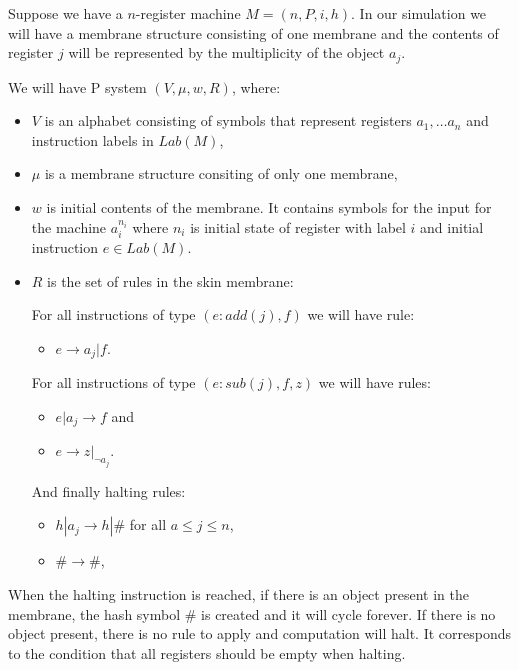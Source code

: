 \documentclass[a4paper,10pt]{article}
\begin{document}
\begin{dokaz}
\label{proof:reg_by_inh}
  Suppose we have a $n$-register machine $M = (n,P,i,h)$. In our simulation we will have a membrane structure consisting of one membrane and the contents of register $j$ will be represented by the multiplicity of the object $a_j$.

  We will have P system $(V, \mu, w, R)$, where:
  \begin{itemize}
    \item $V$ is an alphabet consisting of symbols that represent registers $a_1,\dots a_n$ and instruction labels in $Lab(M)$,
    \item $\mu$ is a membrane structure consiting of only one membrane,
    \item $w$ is initial contents of the membrane. It contains symbols for the input for the machine $a_i^{n_i}$ where $n_i$ is initial state of register with label $i$ and initial instruction $e \in Lab(M)$.
    \item $R$ is the set of rules in the skin membrane:
    
    For all instructions of type $(e : add(j), f)$ we will have rule:
    \begin{itemize}
      \item $e \rightarrow a_j|f$.
    \end{itemize}
    
    For all instructions of type $(e : sub(j), f, z)$ we will have rules:
    \begin{itemize}
      \item $e|a_j \rightarrow f$ and
      \item $e \rightarrow z|_{\neg a_j}$.
    \end{itemize}

    And finally halting rules:
    \begin{itemize}
      \item $h|a_j \rightarrow h|\#$ for all $a\leq j\leq n$,
      \item $\# \rightarrow \#$,
    \end{itemize}
  \end{itemize}

  When the halting instruction is reached, if there is an object present in the membrane, the hash symbol $\#$ is created and it will cycle forever. If there is no object present, there is no rule to apply and computation will halt. It corresponds to the condition that all registers should be empty when halting.
\end{dokaz}
\end{document}
